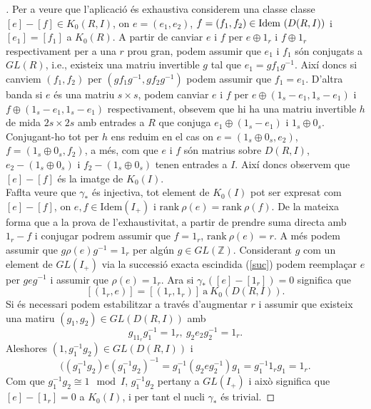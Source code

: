 \begin{proof}[]
\indent Per a veure que l'aplicació és exhaustiva considerem una classe classe $[e]-[f]\in K_0(R,I)$, on $e=(e_1,e_2)$, $f=(f_1,f_2)\in \mathrm{Idem} \  (D(R,I))$ i $[e_1]=[f_1]$ a $K_0(R)$.
 A partir de canviar $e$ i $f$ per $e\oplus 1_r$ i $f\oplus 1_r$ respectivament per a una $r$ prou gran, podem assumir que $e_1$ i $f_1$ són conjugats a $GL(R)$, i.e., existeix una matriu invertible $g$ tal que $e_1=gf_1g^{-1}$. Així doncs si canviem $(f_1,f_2)$ per $(gf_1g^{-1}, gf_2g^{-1})$ podem assumir que $f_1=e_1$.  D'altra banda si $e$ és una matriu $s\times s$, podem canviar $e$ i $f$ per $e\oplus (1_s-e_1,1_s-e_1)$ i $f\oplus (1_s-e_1,1_s-e_1)$ respectivament, obsevem que hi ha una matriu invertible $h$ de mida $2s\times 2s$ amb entrades a $R$ que conjuga $e_1\oplus (1_s-e_1)$ i $1_s\oplus 0_s$. Conjugant-ho tot per $h$ ens reduim en el cas on $e=(1_s\oplus 0_s, e_2)$, $f=(1_s \oplus 0_s, f_2)$, a més, com que $e$ i $f$ són matrius sobre $D(R,I)$, $e_2-(1_s \oplus 0_s)$ i $f_2-(1_s\oplus 0_s)$ tenen entrades a $I$. Així doncs observem que $[e]-[f]$ és la imatge de $K_0(I)$.
\\ \indent Faflta veure que $\gamma_*$ és injectiva, tot element de $K_0(I)$ pot ser expresat com $[e]-[f]$, on $e,f\in \text{Idem}(I_+)$ i $\text{rank} \ \rho(e) = \text{rank} \ \rho (f)$. De la mateixa forma que a la prova de l'exhaustivitat, a partir de prendre suma directa amb $1_r-f$ i conjugar podrem assumir que $f=1_r$, $\text{rank} \ \rho (e)=r$. A més podem assumir que $g\rho (e) g^{-1}=1_r$ per algún $g\in GL(\mathbb{Z})$. Considerant $g$ com un element de $GL(I_+)$ via la successió exacta escindida (\ref{suc}) podem reemplaçar $e$ per $geg^{-1}$ i assumir que $\rho(e)=1_r$. Ara si $\gamma_*([e]-[1_r])=0$ significa que 
$$
[(1_r,e)]=[(1_r,1_r)] \ \text{a} \ K_0(D(R,I)).
$$
Si és necessari podem estabilitzar a través d'augmentar $r$ i assumir que existeix una matiru $(g_1,g_2)\in GL(D(R,I))$ amb 
$$
g_11_rg_1^{-1}=1_r, \ g_2e_2g_2^{-1}=1_r.
$$
Aleshores $(1, g_1^{-1}g_2) \in GL(D(R,I))$ i 
$$
(
(g_1^{-1}g_2)e(g_1^{-1}g_2)^{-1} = g_1^{-1}(g_2eg_2^{-1})g_1 = g_1^{-1}1_rg_1 = 1_r.
$$
Com que $g_1^{-1}g_2 \cong 1 \mod I$, $g_1^{-1}g_2$ pertany a $GL(I_+)$ i això significa que $[e]-[1_r]=0$ a $K_0(I)$, i per tant el nucli $\gamma_*$ és trivial.
\end{proof}

